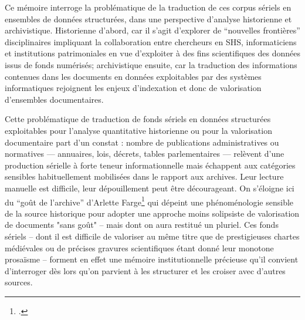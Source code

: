 Ce mémoire interroge la problématique de la traduction de ces corpus sériels en ensembles de données structurées, dans une perspective d’analyse historienne et archivistique. 
Historienne d'abord, car il s'agit d'explorer de \enquote{nouvelles frontières} disciplinaires impliquant la collaboration entre chercheurs en SHS, informaticiens et institutions patrimoniales en vue d'exploiter à des fins scientifiques des données issus de fonds numérisés; archivistique ensuite, car la traduction des informations contenues dans les documents en données exploitables par des systèmes informatiques rejoignent les enjeux d'indexation et donc de valorisation d'ensembles documentaires.

Cette problématique de traduction de fonds sériels en données structurées exploitables pour l'analyse quantitative historienne ou pour la valorisation documentaire part d’un constat : nombre de publications administratives ou normatives — annuaires, lois, décrets, tables parlementaires — relèvent d’une production sérielle à forte teneur informationnelle mais échappent aux catégories sensibles habituellement mobilisées dans le rapport aux archives. Leur lecture manuelle est difficile, leur dépouillement peut être décourageant. On s'éloigne ici du \enquote{goût de l'archive} d'Arlette Farge\footcite{farge} qui dépeint une phénoménologie sensible de la source historique pour adopter une approche moins solipsiste de valorisation de documents "sans goût" -- mais dont on aura restitué un pluriel. Ces fonds sériels -- dont il est difficile de valoriser au même titre que de prestigieuses chartes médiévales ou de précises gravures scientifiques étant donné leur monotone prosaïsme -- forment en effet une mémoire institutionnelle précieuse qu'il convient d'interroger dès lors qu’on parvient à les structurer et les croiser avec d’autres sources.

